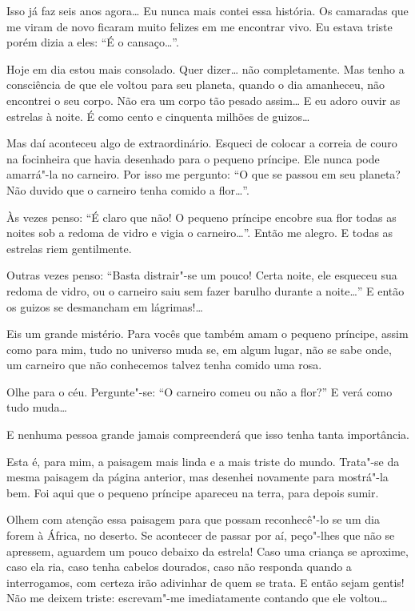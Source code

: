 \begin{Parallel}[p]{}{}
{Isso já faz seis anos agora\ldots{} Eu nunca mais contei essa história. Os
camaradas que me viram de novo ficaram muito felizes em me encontrar
vivo. Eu estava triste porém dizia a eles: ``É o cansaço\ldots{}''.

Hoje em dia estou mais consolado. Quer dizer\ldots{} não completamente. Mas
tenho a consciência de que ele voltou para seu planeta, quando o dia
amanheceu, não encontrei o seu corpo. Não era um corpo tão pesado
assim\ldots{} E eu adoro ouvir as estrelas à noite. É como cento e cinquenta
milhões de guizos\ldots{}

Mas daí aconteceu algo de extraordinário. Esqueci de colocar a correia
de couro na focinheira que havia desenhado para o pequeno príncipe. Ele
nunca pode amarrá"-la no carneiro. Por isso me pergunto: ``O que se
passou em seu planeta? Não duvido que o carneiro tenha comido a
flor\ldots{}''.

Às vezes penso: ``É claro que não! O pequeno príncipe encobre sua flor
todas as noites sob a redoma de vidro e vigia o carneiro\ldots{}''. Então me
alegro. E todas as estrelas riem gentilmente.

Outras vezes penso: ``Basta distrair"-se um pouco! Certa noite, ele
esqueceu sua redoma de vidro, ou o carneiro saiu sem fazer barulho
durante a noite\ldots{}'' E então os guizos se desmancham em lágrimas!\ldots{}

Eis um grande mistério. Para vocês que também amam o pequeno príncipe,
assim como para mim, tudo no universo muda se, em algum lugar, não se
sabe onde, um carneiro que não conhecemos talvez tenha comido uma rosa.

Olhe para o céu. Pergunte"-se: ``O carneiro comeu ou não a flor?'' E verá
como tudo muda\ldots{}

E nenhuma pessoa grande jamais compreenderá que isso tenha tanta
importância.

Esta é, para mim, a paisagem mais linda e a mais triste do mundo.
Trata"-se da mesma paisagem da página anterior, mas desenhei novamente
para mostrá"-la bem. Foi aqui que o pequeno príncipe apareceu na terra,
para depois sumir.

Olhem com atenção essa paisagem para que possam reconhecê"-lo se um dia
forem à África, no deserto. Se acontecer de passar por aí, peço"-lhes que
não se apressem, aguardem um pouco debaixo da estrela! Caso uma criança
se aproxime, caso ela ria, caso tenha cabelos dourados, caso não
responda quando a interrogamos, com certeza irão adivinhar de quem se
trata. E então sejam gentis! Não me deixem triste: escrevam"-me
imediatamente contando que ele voltou\ldots{}
}
%

\end{Parallel}



